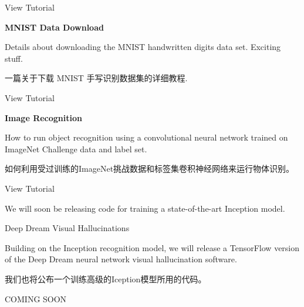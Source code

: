 View Tutorial

\textbf{MNIST Data Download}

Details about downloading the MNIST handwritten digits data set. Exciting stuff.

一篇关于下载 MNIST 手写识别数据集的详细教程.

View Tutorial

\textbf{Image Recognition}

How to run object recognition using a convolutional neural network trained on ImageNet Challenge data and label set.

如何利用受过训练的ImageNet挑战数据和标签集卷积神经网络来运行物体识别。

View Tutorial

We will soon be releasing code for training a state-of-the-art Inception model.

Deep Dream Visual Hallucinations

Building on the Inception recognition model, we will release a TensorFlow version of the Deep Dream neural network visual hallucination software.

我们也将公布一个训练高级的Iception模型所用的代码。

COMING SOON